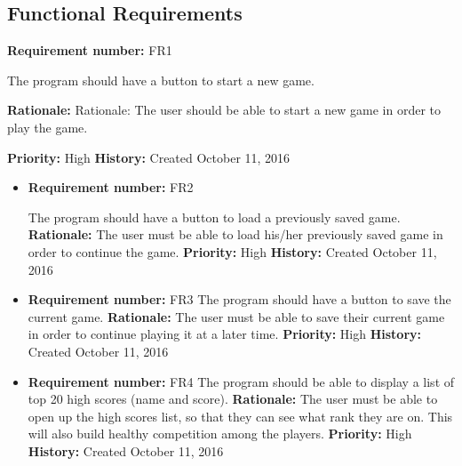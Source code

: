 \documentclass[12pt,letterpaper]{article}
\begin{document}
	\subsection{Functional Requirements}
\begin{reqbox}
	\begin{itemize}
		\textbf{Requirement number: }FR1  
		
		The program should have a button to start a new game.  
		 
		\textbf{Rationale: }Rationale: The user should be able to start a new game in order to play the game.
		
		\textbf{Priority: }High
		\textbf{History: }Created October 11, 2016
	\end{itemize}
\end{reqbox}
\begin{reqbox}
	\begin{itemize}
		\item \textbf{Requirement number: }FR2  
		
		 The program should have a button to load a previously saved game.
		\textbf{Rationale: }The user must be able to load his/her previously saved game in order to continue the game.
		\textbf{Priority: }High
		\textbf{History: }Created October 11, 2016
	\end{itemize}
\end{reqbox}
\begin{reqbox}
	\begin{itemize}
		\item \textbf{Requirement number: }FR3
		The program should have a button to save the current game.
		\textbf{Rationale: }The user must be able to save their current game in order to continue playing it at a later time.
		\textbf{Priority: }High
		\textbf{History: }Created October 11, 2016
	\end{itemize}
\end{reqbox}
\begin{reqbox}
	\begin{itemize}
		\item \textbf{Requirement number: }FR4
		The program should be able to display a list of top 20 high scores (name and score). 
		\textbf{Rationale: }The user must be able to open up the high scores list, so that they can see what rank they are on. This will also build healthy competition among the players.
		\textbf{Priority: }High
		\textbf{History: }Created October 11, 2016
	\end{itemize}
\end{reqbox}
\end{document}
